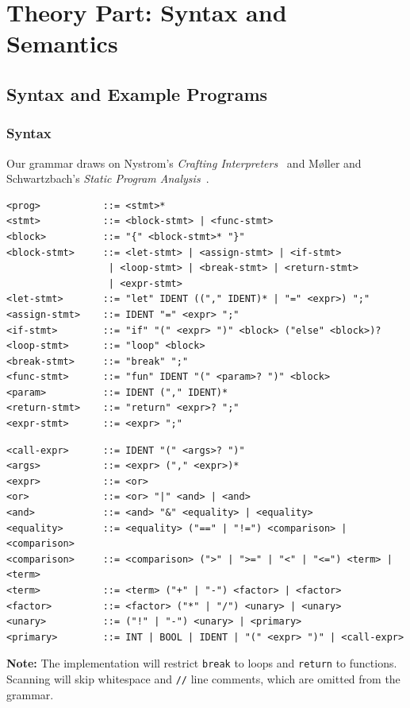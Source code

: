 \documentclass{article}
\begin{document}
\section{Theory Part: Syntax and Semantics}

\subsection{Syntax and Example Programs}

\subsubsection{Syntax}
Our grammar draws on Nystrom's \emph{Crafting
Interpreters}~\cite{crafting-grammar,crafting-expressions} and
M{\o}ller and Schwartzbach's \emph{Static Program
Analysis}~\cite{moller-schwartzbach-spa}.

\begin{Verbatim}[fontsize=\footnotesize,baselinestretch=0.95]
<prog>           ::= <stmt>*
<stmt>           ::= <block-stmt> | <func-stmt>
<block>          ::= "{" <block-stmt>* "}"
<block-stmt>     ::= <let-stmt> | <assign-stmt> | <if-stmt>
                  | <loop-stmt> | <break-stmt> | <return-stmt>
                  | <expr-stmt>
<let-stmt>       ::= "let" IDENT (("," IDENT)* | "=" <expr>) ";"
<assign-stmt>    ::= IDENT "=" <expr> ";"
<if-stmt>        ::= "if" "(" <expr> ")" <block> ("else" <block>)?
<loop-stmt>      ::= "loop" <block>
<break-stmt>     ::= "break" ";"
<func-stmt>      ::= "fun" IDENT "(" <param>? ")" <block>
<param>          ::= IDENT ("," IDENT)*
<return-stmt>    ::= "return" <expr>? ";"
<expr-stmt>      ::= <expr> ";"
\end{Verbatim}
\begin{Verbatim}[fontsize=\footnotesize,baselinestretch=0.95]
<call-expr>      ::= IDENT "(" <args>? ")"
<args>           ::= <expr> ("," <expr>)*
<expr>           ::= <or>
<or>             ::= <or> "|" <and> | <and>
<and>            ::= <and> "&" <equality> | <equality>
<equality>       ::= <equality> ("==" | "!=") <comparison> | <comparison>
<comparison>     ::= <comparison> (">" | ">=" | "<" | "<=") <term> | <term>
<term>           ::= <term> ("+" | "-") <factor> | <factor>
<factor>         ::= <factor> ("*" | "/") <unary> | <unary>
<unary>          ::= ("!" | "-") <unary> | <primary>
<primary>        ::= INT | BOOL | IDENT | "(" <expr> ")" | <call-expr>
\end{Verbatim}
\noindent\textbf{Note:} The implementation will restrict \texttt{break}
to loops and \texttt{return} to functions. Scanning will skip whitespace
and \texttt{//} line comments, which are omitted from the grammar.
\end{document}
